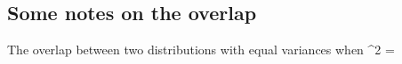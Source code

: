 \documentclass[11pt]{amsart}
\begin{document}
\subsection{Some notes on the overlap}

The overlap between two distributions with equal variances when \sigma^2 = \sigma





\begin{comment}

We denote the nodes in this setting as $1, \dots, n$. We define the model as follows:

\begin{itemize}
\item Let $K$ follow a Poisson distribution $\operatorname{Poisson}(\lambda=1)$, subject to the condition $K>0$.
\item Let $\theta_1, \dots, \theta_K$ be drawn from a Dirichlet distribution with parameter vector $\boldsymbol{\gamma}$.
\item Let $z_i$ be independently and identically drawn from a multinomial distribution with one trial and probability vector $(\theta_1, \dots, \theta_K)$.
\item Let $P = \{p_{i,j}\} \sim \operatorname{POMM}(\alpha,\beta^0_{\max},K)$.
\item Let $y_{i,j}$ follow a binomial distribution with parameters $n_{ij}$ and $p_{z_i, z_j}$, subject to the condition $n_{ij} > 0$.
\end{itemize}

Here, $z_i$ takes values in ${1, \dots, K}$. The likelihood function can be specified as:

\begin{equation}
p(\textbf{y} | p, z) = \prod_{i<j}^{n-1} {n_{ij} \choose y_{ij}} p_{z_i, z_j}^{y_{ij}}(1- p_{z_i, z_j})^{n_{ij}-y_{ij}}
\end{equation}

To specify the prior distribution, we start with the prior on $z$ following a multinomial distribution. We have $n$ players to assign to $K$ different labels, by replacing the extracted labels after each draw. We denote the variable which is the extracted label $i \in \{ 1, ..., K \}$ as $Z_i$, and denote as $\theta_i$ the probability that a given extraction will be of label $i$. The joint probability of $Z_1,\ldots,Z_n$ will be: 
\begin{align}
f(z_1,\ldots,z_n,\theta_1, \ldots, \theta_K ) & {} = \Pr(Z_1 = z_1,\ldots, Z_n = z_n) \\
& {} = \begin{cases} { \displaystyle {n! \over n_1!\cdots n_K!}\theta_1^{n_1}\times\cdots\times \theta_K^{n_K}}, \quad &
\text{when } \sum_{i=1}^K n_i=n \\  \\
0 & \text{otherwise,} \end{cases}
\end{align}


\end{comment}
\end{document}
